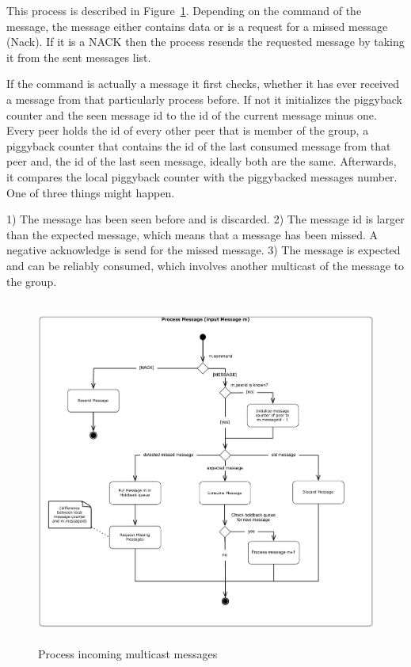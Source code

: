 This process is described in Figure~\ref{fig:figures_processMessages}.
Depending on the command of the message, the message either contains data or is a request for a missed message (Nack). If it is a NACK  then the process resends the requested message by taking it from the sent messages list.



If the command is actually a message it first checks, whether it has ever received a message from that particularly process before. If not it initializes the piggyback counter and the seen message id to the id of the current message minus one. 
Every peer holds the id of every other peer that is member of the group, a piggyback counter that contains the id of the last consumed message from that peer and, the id of the last seen message, ideally both are the same.
Afterwards, it compares the local piggyback counter with the piggybacked messages number. One of three things might happen. 

1) The message has been seen before and is discarded.
2) The message id is larger than the expected message, which means that a message has been missed. A negative acknowledge is send for the missed message. 
3) The message is expected and can be reliably consumed, which involves another multicast of the message to the group.
 
\begin{figure}[htbp]
    \centering
        \includegraphics[height=4.5in]{figures/processMessages.pdf}
    \caption{Process incoming multicast messages}
    \label{fig:figures_processMessages}
\end{figure}

